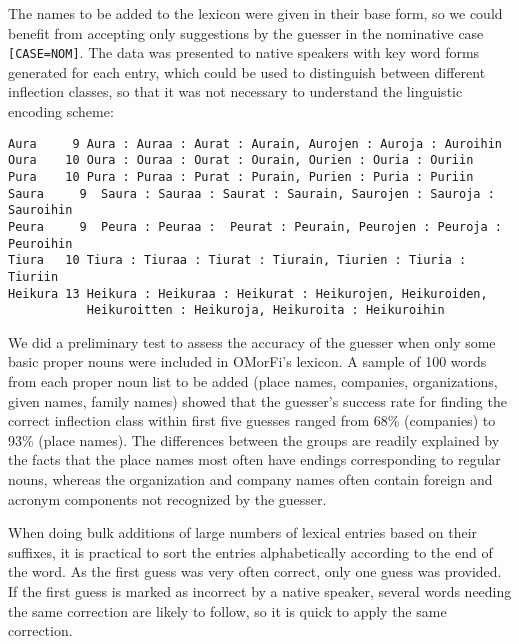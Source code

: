 \documentclass{llncs}
\begin{document}
The names to be added to the lexicon were given in their base form, so we
could benefit from accepting only suggestions by the guesser in the nominative case 
\texttt{[CASE=NOM]}. The data was presented to native speakers with key word forms 
generated for each entry, which could be used to distinguish between different inflection classes,
so that it was not necessary to understand the linguistic encoding scheme:
\small
\begin{verbatim}
Aura     9 Aura : Auraa : Aurat : Aurain, Aurojen : Auroja : Auroihin
Oura    10 Oura : Ouraa : Ourat : Ourain, Ourien : Ouria : Ouriin
Pura    10 Pura : Puraa : Purat : Purain, Purien : Puria : Puriin
Saura     9  Saura : Sauraa : Saurat : Saurain, Saurojen : Sauroja : Sauroihin
Peura     9  Peura : Peuraa :  Peurat : Peurain, Peurojen : Peuroja : Peuroihin
Tiura   10 Tiura : Tiuraa : Tiurat : Tiurain, Tiurien : Tiuria : Tiuriin
Heikura 13 Heikura : Heikuraa : Heikurat : Heikurojen, Heikuroiden, 
           Heikuroitten : Heikuroja, Heikuroita : Heikuroihin
\end{verbatim}
\normalsize


We did a preliminary test to assess the accuracy of the guesser when only
some basic proper nouns were included in OMorFi's lexicon. A sample of
100 words from each proper noun list to be added (place names,
companies, organizations, given names, family names) showed that the
guesser's 
success rate for finding the correct
inflection class within first five guesses ranged from 68\% (companies) to 93\% (place
names). The differences between the groups are readily explained by
the facts that the place names most often have endings corresponding
to regular nouns, whereas the organization and company names often
contain foreign and acronym components not recognized by the guesser.

When doing bulk additions of large numbers of lexical entries based on
their suffixes, it is practical to sort the entries alphabetically according to the end of the word. As the first guess was very often correct, only one guess was provided. If the first guess is marked as incorrect by a native speaker, several words needing the same correction are likely to follow, so it is quick to apply the same correction.
\end{document}
